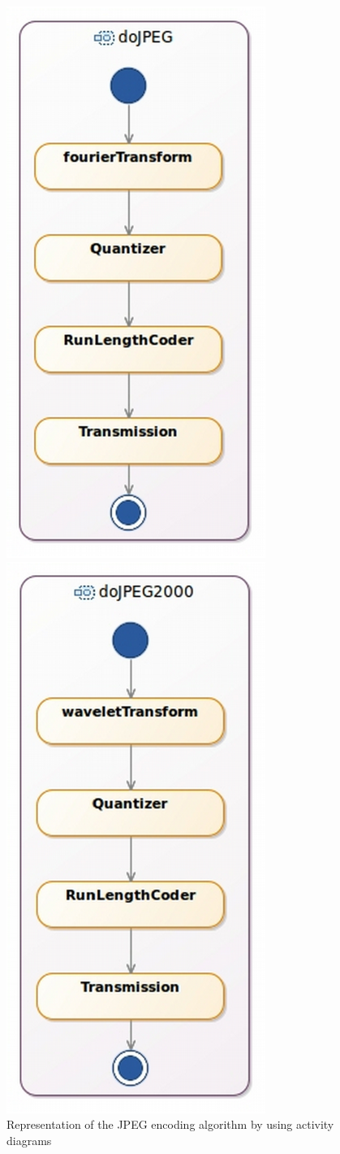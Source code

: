 \begin{itemize}
	
	\begin{figure}[h]
		\centering
		\begin{minipage}{0.45\textwidth}
			\centering
			\includegraphics[width=.5\columnwidth]{examples/figs/dojpeg.pdf}
			\caption{Representation of the JPEG encoding algorithm by using activity diagrams}
			\label{fig:dojpeg}
		\end{minipage}\hfill
		\begin{minipage}{0.45\textwidth}
			\centering
			\includegraphics[width=.5\columnwidth]{examples/figs/dojpeg2000.pdf}

\end{minipage}
\end{figure}
\end{itemize}
